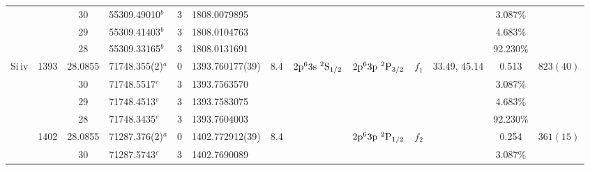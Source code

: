 \begin{table*}
\begin{center}
{\begin{tabular}{:l;l;c;l;c;l;c;l;l;c;c;c;c}
\rowstyle{\itshape}               &        & 30        & 55309.49010$^{b}$                & 3 &  1808.0079895      &      & $                                        $ & $                                        $ & $      $ &              & 3.087\%   & $          $\\
\rowstyle{\itshape}               &        & 29        & 55309.41403$^{b}$                & 3 &  1808.0104763      &      & $                                        $ & $                                        $ & $      $ &              & 4.683\%   & $          $\\
\rowstyle{\itshape}               &        & 28        & 55309.33165$^{b}$                & 3 &  1808.0131691      &      & $                                        $ & $                                        $ & $      $ &              & 92.230\%  & $          $\\
                    Si{\sc \,iv}  & 1393   & 28.0855   & 71748.355(2)$^{a}$               & 0 &   1393.760177(39)  &  8.4 & $2\rm{p}^63\rm{s}~^2\rm{S}_{1/2}         $ & $2\rm{p}^63\rm{p}~^2\rm{P}_{3/2}         $ & $f_{1} $ & 33.49, 45.14 & 0.513     & $  823(40) $\\
\rowstyle{\itshape}               &        & 30        & 71748.5517$^{c}$                 & 3 &  1393.7563570      &      & $                                        $ & $                                        $ & $      $ &              & 3.087\%   & $          $\\
\rowstyle{\itshape}               &        & 29        & 71748.4513$^{c}$                 & 3 &  1393.7583075      &      & $                                        $ & $                                        $ & $      $ &              & 4.683\%   & $          $\\
\rowstyle{\itshape}               &        & 28        & 71748.3435$^{c}$                 & 3 &  1393.7604003      &      & $                                        $ & $                                        $ & $      $ &              & 92.230\%  & $          $\\
                                  & 1402   & 28.0855   & 71287.376(2)$^{a}$               & 0 &   1402.772912(39)  &  8.4 & $                                        $ & $2\rm{p}^63\rm{p}~^2\rm{P}_{1/2}         $ & $f_{2} $ &              & 0.254     & $  361(15) $\\
\rowstyle{\itshape}               &        & 30        & 71287.5743$^{c}$                 & 3 &  1402.7690089      &      & $                                        $ & $                                        $ & $      $ &              & 3.087\%   & $          $\\

\end{tabular}}
\end{center}
\end{table*}
